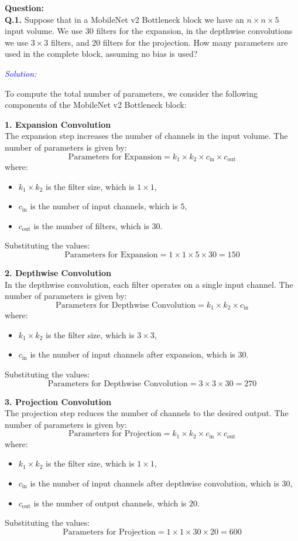 \documentclass[letterpaper,12pt,notitlepage,twoside]{report}
\begin{document}
\textbf{Question:} \\
\textbf{Q.1.} Suppose that in a MobileNet v2 Bottleneck block we have an $n \times n \times 5$ input volume. We use $30$ filters for the expansion, in the depthwise convolutions we use $3 \times 3$ filters, and $20$ filters for the projection. How many parameters are used in the complete block, assuming no bias is used?

\textcolor{blue}{\textit{Solution:}} 

To compute the total number of parameters, we consider the following components of the MobileNet v2 Bottleneck block:

\textbf{1. Expansion Convolution} \\
The expansion step increases the number of channels in the input volume. The number of parameters is given by:
\[
\text{Parameters for Expansion} = k_1 \times k_2 \times c_{\text{in}} \times c_{\text{out}}
\]
where:
\begin{itemize}
    \item $k_1 \times k_2$ is the filter size, which is $1 \times 1$,
    \item $c_{\text{in}}$ is the number of input channels, which is $5$,
    \item $c_{\text{out}}$ is the number of filters, which is $30$.
\end{itemize}
Substituting the values:
\[
\text{Parameters for Expansion} = 1 \times 1 \times 5 \times 30 = 150
\]

\textbf{2. Depthwise Convolution} \\
In the depthwise convolution, each filter operates on a single input channel. The number of parameters is given by:
\[
\text{Parameters for Depthwise Convolution} = k_1 \times k_2 \times c_{\text{in}}
\]
where:
\begin{itemize}
    \item $k_1 \times k_2$ is the filter size, which is $3 \times 3$,
    \item $c_{\text{in}}$ is the number of input channels after expansion, which is $30$.
\end{itemize}
Substituting the values:
\[
\text{Parameters for Depthwise Convolution} = 3 \times 3 \times 30 = 270
\]

\textbf{3. Projection Convolution} \\
The projection step reduces the number of channels to the desired output. The number of parameters is given by:
\[
\text{Parameters for Projection} = k_1 \times k_2 \times c_{\text{in}} \times c_{\text{out}}
\]
where:
\begin{itemize}
    \item $k_1 \times k_2$ is the filter size, which is $1 \times 1$,
    \item $c_{\text{in}}$ is the number of input channels after depthwise convolution, which is $30$,
    \item $c_{\text{out}}$ is the number of output channels, which is $20$.
\end{itemize}
Substituting the values:
\[
\text{Parameters for Projection} = 1 \times 1 \times 30 \times 20 = 600
\]
\end{document}
